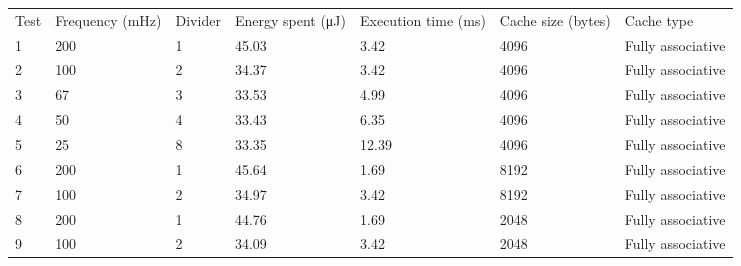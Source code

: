 \begin{table}[]
\begin{tabular}{lllllll}
Test & Frequency (mHz) & Divider & Energy spent (μJ) & Execution time (ms) & Cache size (bytes) & Cache type        \\
1    & 200             & 1       & 45.03             & 3.42                & 4096               & Fully associative \\
2    & 100             & 2       & 34.37             & 3.42                & 4096               & Fully associative \\
3    & 67              & 3       & 33.53             & 4.99                & 4096               & Fully associative \\
4    & 50              & 4       & 33.43             & 6.35                & 4096               & Fully associative \\
5    & 25              & 8       & 33.35             & 12.39               & 4096               & Fully associative \\
6    & 200             & 1       & 45.64             & 1.69                & 8192               & Fully associative \\
7    & 100             & 2       & 34.97             & 3.42                & 8192               & Fully associative \\
8    & 200             & 1       & 44.76             & 1.69                & 2048               & Fully associative \\
9    & 100             & 2       & 34.09             & 3.42                & 2048               & Fully associative
\end{tabular}
\end{table}